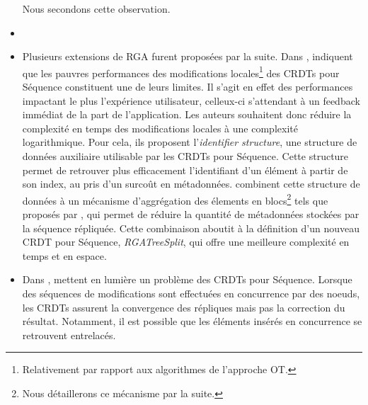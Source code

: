 \begin{itemize}
\begin{enumerate}[label=(\roman*)]
    \end{enumerate}
    Nous secondons cette observation.
  \item {}
  \item Plusieurs extensions de \ac{RGA} furent proposées par la suite.
    Dans \cite{briot:hal-01343941}, \citeauthor{briot:hal-01343941} indiquent que les pauvres performances des modifications locales\footnote{Relativement par rapport aux algorithmes de l'approche \ac{OT}.} des \acp{CRDT} pour Séquence constituent une de leurs limites.
    Il s'agit en effet des performances impactant le plus l'expérience utilisateur, celleux-ci s'attendant à un feedback immédiat de la part de l'application.
    Les auteurs souhaitent donc réduire la complexité en temps des modifications locales à une complexité logarithmique.
    Pour cela, ils proposent l'\emph{identifier structure}, une structure de données auxiliaire utilisable par les \acp{CRDT} pour Séquence.
    Cette structure permet de retrouver plus efficacement l'identifiant d'un élément à partir de son index, au pris d'un surcoût en métadonnées.
    \citeauthor{briot:hal-01343941} combinent cette structure de données à un mécanisme d'aggrégation des élements en blocs\footnote{Nous détaillerons ce mécanisme par la suite.} tels que proposés par \cite{2012-string-wise,2013-logootsplit}, qui permet de réduire la quantité de métadonnées stockées par la séquence répliquée.
    Cette combinaison aboutit à la définition d'un nouveau \ac{CRDT} pour Séquence, \emph{RGATreeSplit}, qui offre une meilleure complexité en temps et en espace.
  \item Dans \cite{2019-interleaving-anomalies-collaborative-editors-kleppmann}, \citeauthor{2019-interleaving-anomalies-collaborative-editors-kleppmann} mettent en lumière un problème des \acp{CRDT} pour Séquence.
    Lorsque des séquences de modifications sont effectuées en concurrence par des noeuds, les \acp{CRDT} assurent la convergence des répliques mais pas la correction du résultat.
    Notamment, il est possible que les éléments insérés en concurrence se retrouvent entrelacés.
    \begin{figure}[!ht]


\end{figure}
\end{itemize}
